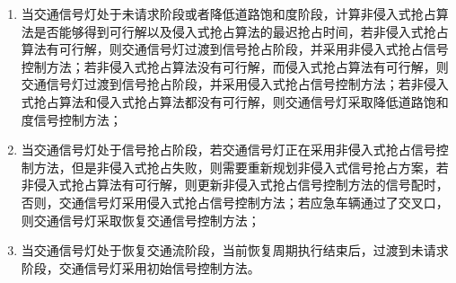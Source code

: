 \begin{enumerate}
	\item 当交通信号灯处于未请求阶段或者降低道路饱和度阶段，计算非侵入式抢占算法是否能够得到可行解以及侵入式抢占算法的最迟抢占时间，若非侵入式抢占算法有可行解，则交通信号灯过渡到信号抢占阶段，并采用非侵入式抢占信号控制方法；若非侵入式抢占算法没有可行解，而侵入式抢占算法有可行解，则交通信号灯过渡到信号抢占阶段，并采用侵入式抢占信号控制方法；若非侵入式抢占算法和侵入式抢占算法都没有可行解，则交通信号灯采取降低道路饱和度信号控制方法；
	\item 当交通信号灯处于信号抢占阶段，若交通信号灯正在采用非侵入式抢占信号控制方法，但是非侵入式抢占失败，则需要重新规划非侵入式信号抢占方案，若非侵入式抢占算法有可行解，则更新非侵入式抢占信号控制方法的信号配时，否则，交通信号灯采用侵入式抢占信号控制方法；若应急车辆通过了交叉口，则交通信号灯采取恢复交通信号控制方法；
	\item 当交通信号灯处于恢复交通流阶段，当前恢复周期执行结束后，过渡到未请求阶段，交通信号灯采用初始信号控制方法。
\end{enumerate}



